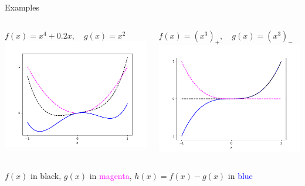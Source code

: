 \documentclass[aspectratio=169,11pt]{beamer}
\begin{document}
\begin{frame}{Examples}
\begin{columns}
\begin{column}{0.5\textwidth}
\centering
$f(x) = x^4 + 0.2 x, \quad g(x) = x^2$ \\
\includegraphics[width=\textwidth]{DC1.pdf}
\end{column}
\begin{column}{0.5\textwidth}
\centering
$f(x) = (x^3)_+, \quad g(x) = (x^3)_-$ \\
\includegraphics[width=\textwidth]{DC2.pdf}
\end{column}
\end{columns}
\vfill\centering
$f(x)$ in black,
$g(x)$ in \textcolor{magenta}{magenta},
$h(x) = f(x) - g(x)$ in \textcolor{blue}{blue}
\end{frame}
\end{document}
